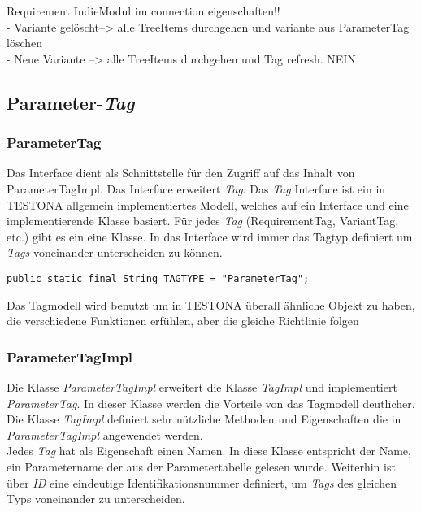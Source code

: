 Requirement IndieModul im connection eigenschaften!!\\
- Variante gelöscht--> alle TreeItems durchgehen und variante aus ParameterTag löschen\\
- Neue Variante --> alle TreeItems durchgehen und Tag refresh. NEIN

\subsection{Parameter-\textit{Tag}}\label{sub.ParameterTag}
\subsubsection{ParameterTag}
Das Interface dient als Schnittstelle für den Zugriff auf das Inhalt von ParameterTagImpl. Das Interface erweitert \textit{Tag}. Das \textit{Tag} Interface ist ein in TESTONA allgemein implementiertes Modell, welches auf ein Interface und eine implementierende Klasse basiert. Für jedes \textit{Tag} (RequirementTag, VariantTag, etc.) gibt es ein eine Klasse. In das Interface wird immer das Tagtyp definiert um \textit{Tags} voneinander unterscheiden zu können.

\begin{lstlisting}[caption={ParameterTag Interface}, captionpos=b]
public static final String TAGTYPE = "ParameterTag";
\end{lstlisting}

Das Tagmodell wird benutzt um in TESTONA überall ähnliche Objekt zu haben, die verschiedene Funktionen erfühlen, aber die gleiche Richtlinie folgen

\subsubsection{ParameterTagImpl}
Die Klasse \textit{ParameterTagImpl} erweitert die Klasse \textit{TagImpl} und implementiert \textit{ParameterTag}. In dieser Klasse werden die Vorteile von das Tagmodell deutlicher. Die Klasse \textit{TagImpl} definiert sehr nützliche Methoden und Eigenschaften die in \textit{ParameterTagImpl} angewendet werden.\\

Jedes \textit{Tag} hat als Eigenschaft einen Namen. In diese Klasse entspricht der Name, ein Parametername der aus der Parametertabelle gelesen wurde. Weiterhin ist über \textit{ID} eine eindeutige Identifikationsnummer definiert, um \textit{Tags} des gleichen Typs voneinander zu unterscheiden.\\


